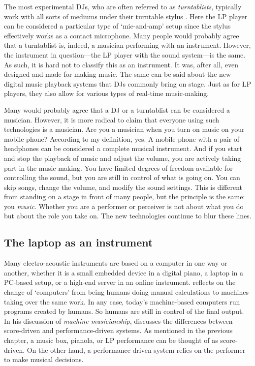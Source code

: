 The most experimental DJs, who are often referred to as \emph{turntablists}, typically work with all sorts of mediums under their turntable stylus \citep{smith_hip-hop_2013,holmes_electronic_2016}. Here the LP player can be considered a particular type of `mic-and-amp' setup since the stylus effectively works as a contact microphone. Many people would probably agree that a turntablist is, indeed, a musician performing with an instrument. However, the instrument in question---the LP player with the sound system---is the same. As such, it is hard not to classify this as an instrument. It was, after all, even designed and made for making music. The same can be said about the new digital music playback systems that DJs commonly bring on stage. Just as for LP players, they also allow for various types of real-time music-making.

Many would probably agree that a DJ or a turntablist can be considered a musician. However, it is more radical to claim that everyone using such technologies is a musician. Are you a musician when you turn on music on your mobile phone? According to my definition, yes. A mobile phone with a pair of headphones can be considered a complete musical instrument. And if you start and stop the playback of music and adjust the volume, you are actively taking part in the music-making. You have limited degrees of freedom available for controlling the sound, but you are still in control of what is going on. You can skip songs, change the volume, and modify the sound settings. This is different from standing on a stage in front of many people, but the principle is the same: you \emph{music}. Whether you are a performer or perceiver is not about what you do but about the role you take on. The new technologies continue to blur these lines.


\subsection{The laptop as an instrument}

Many electro-acoustic instruments are based on a computer in one way or another, whether it is a small embedded device in a digital piano, a laptop in a PC-based setup, or a high-end server in an online instrument. \citet{kvifte_instruments_1989} reflects on the change of `computers' from being humans doing manual calculations to machines taking over the same work. In any case, today's machine-based computers run programs created by humans. So humans are still in control of the final output. In his discussion of \emph{machine musicianship}, \citet{rowe_interactive_1993} discusses the differences between score-driven and performance-driven systems. As mentioned in the previous chapter, a music box, pianola, or LP performance can be thought of as score-driven. On the other hand, a performance-driven system relies on the performer to make musical decisions.

